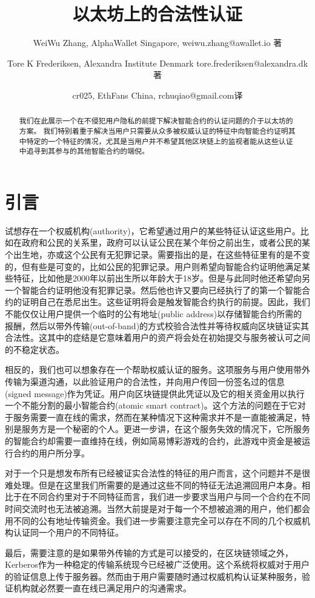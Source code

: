 \documentclass[UTF8]{ctexart}
\title{以太坊上的合法性认证}
\author{WeiWu Zhang, AlphaWallet Singapore, weiwu.zhang@awallet.io 著 \and Tore K Frederiksen, Alexandra Institute Denmark tore.frederiksen@alexandra.dk 著 \and cr025, EthFans China, rchuqiao@gmail.com译}
\begin{document}
\maketitle

\begin{abstract}
我们在此展示一个在不侵犯用户隐私的前提下解决智能合约的认证问题的介于以太坊的方案。 我们特别着重于解决当用户只需要从众多被权威认证的特征中向智能合约证明其中特定的一个特征的情况，尤其是当用户并不希望其他区块链上的监视者能从这些认证中追寻到其参与的其他智能合约的端倪。
\end{abstract}

\section{引言}
试想存在一个权威机构(authority)，它希望通过用户的某些特征认证这些用户。比如在政府和公民的关系里，政府可以认证公民在某个年份之前出生，或者公民的某个出生地，亦或这个公民有无犯罪记录。需要指出的是，在这些特征里有的是不变的，但有些是可变的，比如公民的犯罪记录。用户则希望向智能合约证明他满足某些特征，比如他是2000年以前出生所以年龄大于18岁。但是与此同时他还希望向另一个智能合约证明他没有犯罪记录。然后他也许又要向已经执行了的第一个智能合约的证明自己在悉尼出生。这些证明将会是触发智能合约执行的前提。因此，我们不能仅仅让用户提供一个临时的公有地址(public address)以存储智能合约所需的报酬，然后以带外传输(out-of-band)的方式校验合法性并等待权威向区块链证实其合法性。这其中的症结是它意味着用户的资产将会处在初始提交与服务被认可之间的不稳定状态。

相反的，我们也可以想象存在一个帮助权威认证的服务。这项服务与用户使用带外传输为渠道沟通，以此验证用户的合法性，并向用户传回一份签名过的信息(signed message)作为凭证。用户向区块链提供此凭证以及它的相关资金用以执行一个不能分割的最小智能合约(atomic smart contract)。这个方法的问题在于它对于服务需要一直在线的需求，然而在某种情况下这种需求并不是一直能被满足，特别是服务方是一个秘密的个人。更进一步讲，在这个服务失效的情况下，它所服务的智能合约却需要一直维持在线，例如简易博彩游戏的合约，此游戏中资金是被运行合约的用户所分享。

对于一个只是想发布所有已经被证实合法性的特征的用户而言，这个问题并不是很难处理。但是在这里我们所需要的是通过这些不同的特征无法追溯回用户本身。相比于在不同合约里对于不同特征而言，我们进一步要求当用户与同一个合约在不同时间交流时也无法被追溯。当然大前提是对于每一个不想被追溯的用户，他们都会用不同的公有地址传输资金。我们进一步需要注意完全可以存在不同的几个权威机构认证同一个用户的不同特征。

最后，需要注意的是如果带外传输的方式是可以接受的，在区块链领域之外，Kerberos作为一种稳定的传输系统现今已经被广泛使用。这个系统将权威对于用户的验证信息上传于服务器。然而由于用户需要随时通过权威机构认证某种服务，验证机构就必然要一直在线已满足用户的沟通需求。
\end{document}
